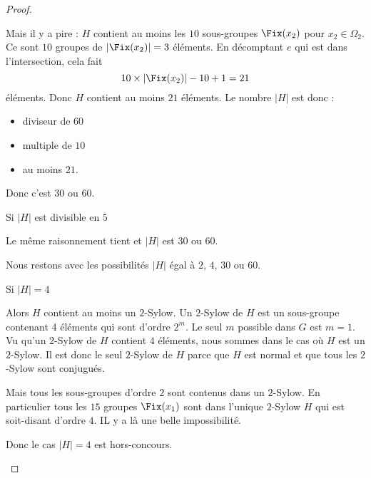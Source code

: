 \begin{proof}
\begin{subproof}
                Mais il y a pire : \( H\) contient au moins les \( 10\) sous-groupes \( \Fix(x_2)\) pour \( x_2\in \Omega_2\). Ce sont \( 10\) groupes de \( | \Fix(x_2) |=3\) éléments. En décomptant \( e\) qui est dans l'intersection, cela fait
                \begin{equation}
                    10\times | \Fix(x_2) |-10+1=21
                \end{equation}
                éléments. Donc \( H\) contient au moins \( 21\) éléments. Le nombre \( | H |\) est donc :
                \begin{itemize}
                    \item diviseur de \( 60\)
                    \item multiple de \( 10\)
                    \item au moins \( 21\).
                \end{itemize}
                Donc c'est \( 30\) ou \( 60\).

            \item[Si \( | H |\) est divisible en \( 5\)]

                Le même raisonnement tient et \( | H |\) est \( 30\) ou \( 60\).

    \end{subproof}

        Nous restons avec les possibilités \( | H |\) égal à \( 2\), \( 4\), \( 30\) ou \( 60\).

    \begin{subproof}

            \item[Si \( | H | = 4\)]

                Alors \( H\) contient au moins un \( 2\)-Sylow. Un \( 2\)-Sylow de \( H\) est un sous-groupe contenant \( 4\) éléments qui sont d'ordre \( 2^m\). Le seul \( m\) possible dans \( G\) est \( m=1\). Vu qu'un \( 2\)-Sylow de \( H\) contient \( 4\) éléments, nous sommes dans le cas où \( H\) est un \( 2\)-Sylow. Il est donc le seul \( 2\)-Sylow de \( H\) parce que \( H\) est normal et que tous les \( 2\)-Sylow sont conjugués.

                Mais tous les sous-groupes d'ordre \( 2\) sont contenus dans un \( 2\)-Sylow. En particulier tous les \( 15\) groupes \( \Fix(x_1)\) sont dans l'unique \( 2\)-Sylow \( H\) qui est soit-disant d'ordre \( 4\). IL y a là une belle impossibilité.

                Donc le cas \( | H |=4\) est hors-concours.


\end{subproof}
\end{proof}
